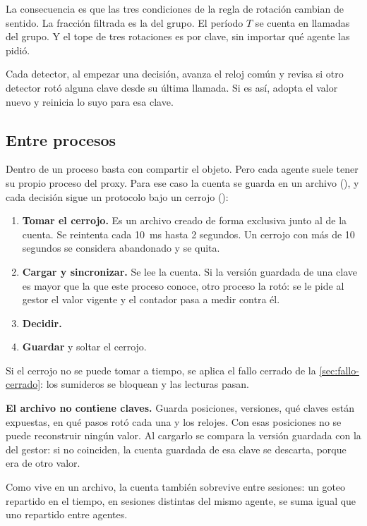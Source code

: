 La consecuencia es que las tres condiciones de la regla de rotación cambian de sentido. La fracción
filtrada es la del grupo. El período $T$ se cuenta en llamadas del grupo. Y el tope de tres rotaciones
es por clave, sin importar qué agente las pidió.

Cada detector, al empezar una decisión, avanza el reloj común y revisa si otro detector rotó alguna
clave desde su última llamada. Si es así, adopta el valor nuevo y reinicia lo suyo para esa clave.

\subsection{Entre procesos}

Dentro de un proceso basta con compartir el objeto. Pero cada agente suele tener su propio proceso del
proxy. Para ese caso la cuenta se guarda en un archivo (), y cada decisión sigue un
protocolo bajo un cerrojo ():

\begin{enumerate}
  \item \textbf{Tomar el cerrojo.} Es un archivo creado de forma exclusiva junto al de la cuenta. Se
    reintenta cada 10~ms hasta 2 segundos. Un cerrojo con más de 10 segundos se considera abandonado
    y se quita.
  \item \textbf{Cargar y sincronizar.} Se lee la cuenta. Si la versión guardada de una clave es mayor
    que la que este proceso conoce, otro proceso la rotó: se le pide al gestor el valor vigente y el
    contador pasa a medir contra él.
  \item \textbf{Decidir.}
  \item \textbf{Guardar} y soltar el cerrojo.
\end{enumerate}

Si el cerrojo no se puede tomar a tiempo, se aplica el fallo cerrado de la \cref{sec:fallo-cerrado}:
los sumideros se bloquean y las lecturas pasan.

\begin{clave}
\textbf{El archivo no contiene claves.} Guarda posiciones, versiones, qué claves están expuestas, en
qué pasos rotó cada una y los relojes. Con esas posiciones no se puede reconstruir ningún valor. Al
cargarlo se compara la versión guardada con la del gestor: si no coinciden, la cuenta guardada de esa
clave se descarta, porque era de otro valor.
\end{clave}

Como vive en un archivo, la cuenta también sobrevive entre sesiones: un goteo repartido en el tiempo,
en sesiones distintas del mismo agente, se suma igual que uno repartido entre agentes.

